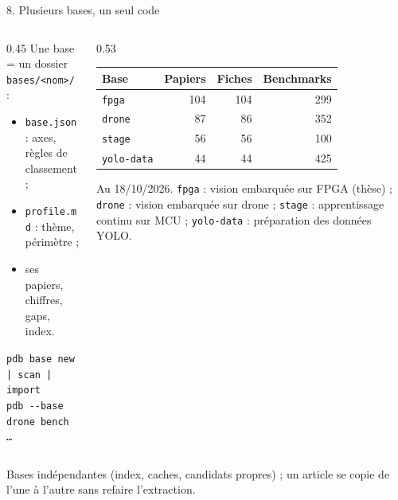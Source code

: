 \documentclass[aspectratio=169,11pt]{beamer}
\newcommand{\cmd}[1]{\texttt{\textcolor{blu}{#1}}}
\begin{document}
\begin{frame}{8. Plusieurs bases, un seul code}
  \begin{columns}[T]
    \begin{column}{0.45\textwidth}
      Une base = un dossier \texttt{bases/<nom>/} :
      \begin{itemize}
        \item \texttt{base.json} : axes, règles de classement ;
        \item \texttt{profile.md} : thème, périmètre ;
        \item ses papiers, chiffres, gaps, index.
      \end{itemize}
      \smallskip
      {\small\cmd{pdb base new | scan | import}\\
      \cmd{pdb -{}-base drone bench …}}
    \end{column}
    \begin{column}{0.53\textwidth}
      \scriptsize
      \begin{tabular}{@{}lrrr@{}}
        \toprule
        \textbf{Base} & \textbf{Papiers} & \textbf{Fiches} & \textbf{Benchmarks} \\
        \midrule
        \texttt{fpga}      & 104 & 104 & 299 \\
        \texttt{drone}     &  87 &  86 & 352 \\
        \texttt{stage}     &  56 &  56 & 100 \\
        \texttt{yolo-data} &  44 &  44 & 425 \\
        \bottomrule
      \end{tabular}

      \smallskip
      {\tiny Au 18/10/2026. \texttt{fpga} : vision embarquée sur FPGA (thèse) ;
      \texttt{drone} : vision embarquée sur drone ; \texttt{stage} : apprentissage continu sur MCU ;
      \texttt{yolo-data} : préparation des données YOLO.}
    \end{column}
  \end{columns}
  \medskip
  {\small Bases indépendantes (index, caches, candidats propres) ; un article se copie de l'une à l'autre
  sans refaire l'extraction.}
\end{frame}
\end{document}
